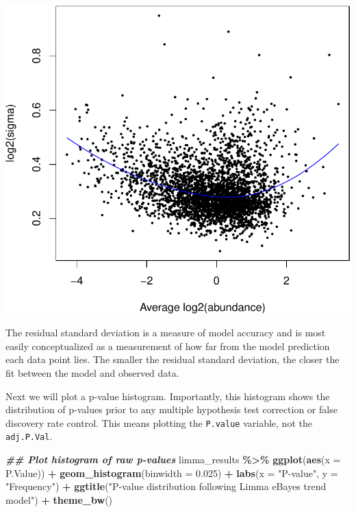 \documentclass[9pt,a4paper,]{extarticle}
\newenvironment{Shaded}{\begin{snugshade}}{\end{snugshade}}
\newcommand{\AttributeTok}[1]{\textcolor[rgb]{0.13,0.29,0.53}{#1}}
\newcommand{\DocumentationTok}[1]{\textcolor[rgb]{0.56,0.35,0.01}{\textbf{\textit{#1}}}}
\newcommand{\FloatTok}[1]{\textcolor[rgb]{0.00,0.00,0.81}{#1}}
\newcommand{\FunctionTok}[1]{\textcolor[rgb]{0.13,0.29,0.53}{\textbf{#1}}}
\newcommand{\NormalTok}[1]{#1}
\newcommand{\SpecialCharTok}[1]{\textcolor[rgb]{0.81,0.36,0.00}{\textbf{#1}}}
\newcommand{\StringTok}[1]{\textcolor[rgb]{0.31,0.60,0.02}{#1}}
\begin{document}
\begin{center}\includegraphics[height=0.3\textheight]{workflow_expressions_files/figure-latex/plotSA-1} \end{center}

The residual standard deviation is a measure of model accuracy and is most
easily conceptualized as a measurement of how far from the model prediction each
data point lies. The smaller the residual standard deviation, the closer the fit
between the model and observed data.

Next we will plot a p-value histogram. Importantly, this histogram shows the
distribution of p-values prior to any multiple hypothesis test correction or
false discovery rate control. This means plotting the \texttt{P.value} variable, not
the \texttt{adj.P.Val}.

\begin{Shaded}
\begin{Highlighting}[]
\DocumentationTok{\#\# Plot histogram of raw p{-}values}
\NormalTok{limma\_results }\SpecialCharTok{\%\textgreater{}\%}
  \FunctionTok{ggplot}\NormalTok{(}\FunctionTok{aes}\NormalTok{(}\AttributeTok{x =}\NormalTok{ P.Value)) }\SpecialCharTok{+}
  \FunctionTok{geom\_histogram}\NormalTok{(}\AttributeTok{binwidth =} \FloatTok{0.025}\NormalTok{) }\SpecialCharTok{+}
  \FunctionTok{labs}\NormalTok{(}\AttributeTok{x =} \StringTok{"P{-}value"}\NormalTok{, }\AttributeTok{y =} \StringTok{"Frequency"}\NormalTok{) }\SpecialCharTok{+}
  \FunctionTok{ggtitle}\NormalTok{(}\StringTok{"P{-}value distribution following Limma eBayes trend model"}\NormalTok{) }\SpecialCharTok{+}
  \FunctionTok{theme\_bw}\NormalTok{()}
\end{Highlighting}
\end{Shaded}
\end{document}
